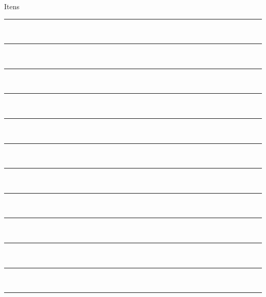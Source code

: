 \documentclass[a4paper,12pt]{article}
\begin{document}
	\begin{minipage}[t][][t]{.3\linewidth}
		{\centering Itens \\}
		\vspace{.14cm}
		
		\rule{\linewidth}{.5pt} \\
		\rule{\linewidth}{.5pt} \\
		\rule{\linewidth}{.5pt} \\
		\rule{\linewidth}{.5pt} \\
		\rule{\linewidth}{.5pt} \\
		\rule{\linewidth}{.5pt} \\
		\rule{\linewidth}{.5pt} \\
		\rule{\linewidth}{.5pt} \\
		\rule{\linewidth}{.5pt} \\
		\rule{\linewidth}{.5pt} \\
		\rule{\linewidth}{.5pt} \\
		\rule{\linewidth}{.5pt} \\
	\end{minipage}%
	\hspace{.04\linewidth}%
\end{document}
